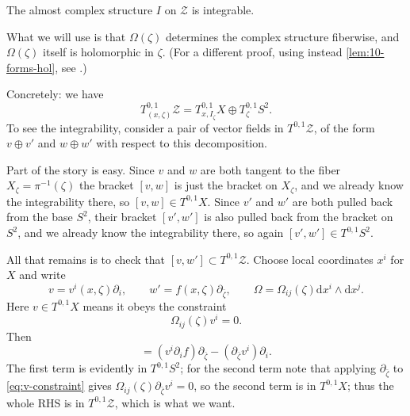 \documentclass[12pt,letterpaper,reqno]{article}
\numberwithin{equation}{section}
\newcommand{\cZ}{\ensuremath{\mathcal Z}}
\newcommand{\de}{\mathrm{d}}
\begin{document}
\begin{prop} The almost complex structure $I$ on $\cZ$ is integrable.
\end{prop}
\begin{pf}
What we will use is that $\Omega(\zeta)$ determines the complex structure fiberwise,
and $\Omega(\zeta)$ itself is holomorphic in $\zeta$.
(For a different proof, using instead \autoref{lem:10-forms-hol},
see \cite{Hitchin:1986ea}.)

Concretely: we have 
\begin{equation}
T^{0,1}_{(x,\zeta)} \cZ = T^{0,1}_{x,I_\zeta} X \oplus T^{0,1}_\zeta S^2.
\end{equation}
To see the integrability, consider a pair of vector fields in $T^{0,1} \cZ$,
of the form $v \oplus v'$
and $w \oplus w'$ with respect to this decomposition.

Part of the story is easy.
Since $v$ and $w$ are both tangent to the fiber $X_{\zeta} = \pi^{-1}(\zeta)$
the bracket $[v,w]$ is just the bracket on $X_{\zeta}$, and we already
know the integrability there, so $[v,w] \in T^{0,1} X$.
Since $v'$ and $w'$ are both pulled back from the base $S^2$,
their bracket $[v',w']$ is also pulled back from the bracket on $S^2$,
and we already know the integrability there, so again $[v',w'] \in T^{0,1} S^2$.

All that remains is to check
that $[v,w'] \subset T^{0,1} \cZ$.
Choose local coordinates $x^i$ for $X$ and write 
\begin{equation}
v = v^i(x,\zeta) \partial_i, \qquad w' = f(x,\zeta) \partial_{\bar \zeta}, \qquad
\Omega = \Omega_{ij}(\zeta) \de x^i \wedge \de x^j. 
\end{equation}
Here $v \in T^{0,1} X$ means it obeys the constraint
\begin{equation} \label{eq:v-constraint}
\Omega_{ij}(\zeta) v^i = 0.
\end{equation}
Then
\begin{equation}
 [v, f \partial_{\bar \zeta}] = (v^i \partial_i f) \partial_{\bar \zeta} - (\partial_{\bar \zeta} v^i) \partial_i.
\end{equation}
The first term is evidently in $T^{0,1} S^2$; for the second term note that
applying $\partial_{\bar \zeta}$ to \eqref{eq:v-constraint}
gives $\Omega_{ij}(\zeta) \partial_{\bar \zeta} v^i = 0$,
so the second term is in $T^{0,1} X$; thus the whole RHS is 
in $T^{0,1} \cZ$, which is what we want.
\end{pf}
\end{document}
